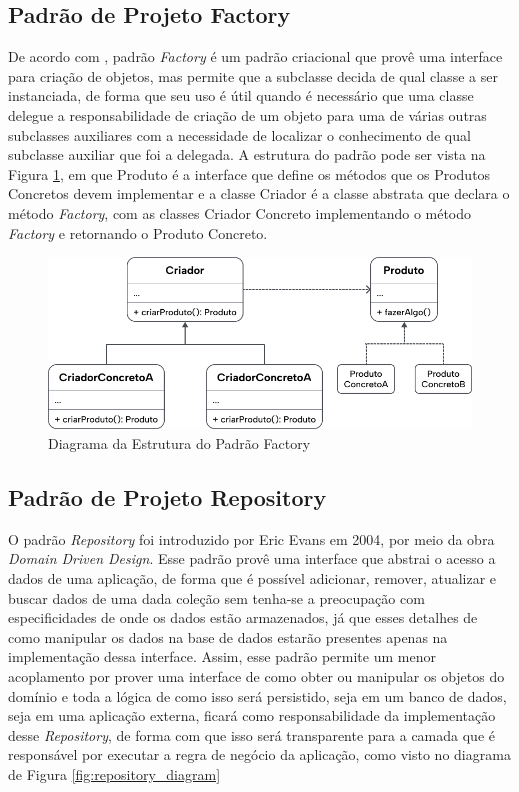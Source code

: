\documentclass[12pt, %
openright, 
oneside, %
a4paper,    %
brazil]{facom-ufu-abntex2}
\begin{document}
\subsection{Padrão de Projeto Factory}

De acordo com , padrão \textit{Factory} é um padrão criacional que provê uma interface para criação de objetos, mas permite que a subclasse decida de qual classe a ser instanciada, de forma que seu uso é útil quando é necessário que uma classe delegue a responsabilidade de criação de um objeto para uma de várias outras subclasses auxiliares com a necessidade de localizar o conhecimento de qual subclasse auxiliar que foi a delegada. A estrutura do padrão pode ser vista na Figura \ref{fig:factory_diagram}, em que Produto é a interface que define os métodos que os Produtos Concretos devem implementar e a classe Criador é a classe abstrata que declara o método \textit{Factory}, com as classes Criador Concreto implementando o método \textit{Factory} e retornando o Produto Concreto.

\begin{figure}[ht]
    \centering
    \includegraphics[width=.65\textwidth]{figures/design_patterns/factory_diagram.png}
    \caption{Diagrama da Estrutura do Padrão Factory}
    \label{fig:factory_diagram}
\end{figure}

\subsection{Padrão de Projeto Repository}
O padrão \textit{Repository} foi introduzido por Eric Evans em 2004, por meio da obra \textit{Domain Driven Design}. Esse padrão provê uma interface que abstrai o acesso a dados de uma aplicação, de forma que é possível adicionar, remover, atualizar e buscar dados de uma dada coleção sem tenha-se a preocupação com especificidades de onde os dados estão armazenados, já que esses detalhes de como manipular os dados na base de dados estarão presentes apenas na implementação dessa interface. Assim, esse padrão permite um menor acoplamento por prover uma interface de como obter ou manipular os objetos do domínio e toda a lógica de como isso será persistido, seja em um banco de dados, seja em uma aplicação externa, ficará como responsabilidade da implementação desse \textit{Repository}, de forma com que isso será transparente para a camada que é responsável por executar a regra de negócio da aplicação, como visto no diagrama de Figura \ref{fig:repository_diagram}
\end{document}

